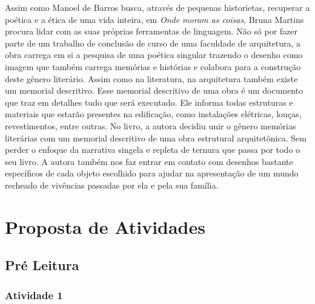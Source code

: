 \documentclass[11pt]{extarticle}
\begin{document}
Assim como Manoel de Barros busca, através de pequenas historietas, recuperar a poética e a ética de uma vida inteira, em \textit{Onde moram as coisas}, Bruna Martins procura lidar com as suas próprias ferramentas de linguagem. Não só por fazer parte de um trabalho de conclusão de curso de uma faculdade de arquitetura, a obra carrega em si a pesquisa de uma poética singular trazendo o desenho como imagem que também carrega memórias e histórias e colabora para a construção deste gênero literário. Assim como na literatura, na arquitetura também existe um memorial descritivo. Esse memorial descritivo de uma obra é um documento que traz em detalhes tudo que será executado. Ele informa todas estruturas e materiais que estarão presentes na edificação, como instalações elétricas, louças, revestimentos, entre outras. No livro, a autora decidiu unir o gênero memórias literárias com um memorial descritivo de uma obra estrutural arquitetônica. Sem perder o enfoque da narrativa singela e repleta de ternura que passa por todo o seu livro. A autora também nos faz entrar em contato com desenhos bastante específicos de cada objeto escolhido para ajudar na apresentação de um mundo recheado de vivências passadas por ela e pela sua família.

\section{Proposta de Atividades}
\subsection{Pré Leitura}
\subsubsection{Atividade 1}

\end{document}
